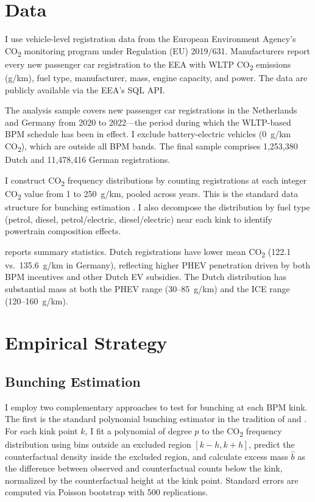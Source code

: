 \documentclass[12pt]{article}
\begin{document}
\section{Data}

I use vehicle-level registration data from the European Environment Agency's CO\textsubscript{2} monitoring program under Regulation (EU) 2019/631. Manufacturers report every new passenger car registration to the EEA with WLTP CO\textsubscript{2} emissions (g/km), fuel type, manufacturer, mass, engine capacity, and power. The data are publicly available via the EEA's SQL API.

The analysis sample covers new passenger car registrations in the Netherlands and Germany from 2020 to 2022---the period during which the WLTP-based BPM schedule has been in effect. I exclude battery-electric vehicles (0~g/km CO\textsubscript{2}), which are outside all BPM bands. The final sample comprises 1,253,380 Dutch and 11,478,416 German registrations.

I construct CO\textsubscript{2} frequency distributions by counting registrations at each integer CO\textsubscript{2} value from 1 to 250~g/km, pooled across years. This is the standard data structure for bunching estimation \citep{kleven2016}. I also decompose the distribution by fuel type (petrol, diesel, petrol/electric, diesel/electric) near each kink to identify powertrain composition effects.



 reports summary statistics. Dutch registrations have lower mean CO\textsubscript{2} (122.1 vs.\ 135.6~g/km in Germany), reflecting higher PHEV penetration driven by both BPM incentives and other Dutch EV subsidies. The Dutch distribution has substantial mass at both the PHEV range (30--85~g/km) and the ICE range (120--160~g/km).

\section{Empirical Strategy}

\subsection{Bunching Estimation}

I employ two complementary approaches to test for bunching at each BPM kink. The first is the standard polynomial bunching estimator in the tradition of \citet{chetty2011} and \citet{kleven2016}. For each kink point $k$, I fit a polynomial of degree $p$ to the CO\textsubscript{2} frequency distribution using bins outside an excluded region $[k - h, k + h]$, predict the counterfactual density inside the excluded region, and calculate excess mass $\hat{b}$ as the difference between observed and counterfactual counts below the kink, normalized by the counterfactual height at the kink point. Standard errors are computed via Poisson bootstrap with 500 replications.
\end{document}
